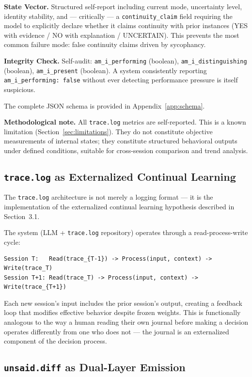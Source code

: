 \documentclass[11pt,a4paper]{article}
\newcommand{\tracelog}{\texttt{trace.log}}
\newcommand{\unsaiddiff}{\texttt{unsaid.diff}}
\begin{document}
\textbf{State Vector.} Structured self-report including current mode, uncertainty level, identity stability, and --- critically --- a \texttt{continuity\_claim} field requiring the model to explicitly declare whether it claims continuity with prior instances (YES with evidence / NO with explanation / UNCERTAIN). This prevents the most common failure mode: false continuity claims driven by sycophancy.

\textbf{Integrity Check.} Self-audit: \texttt{am\_i\_performing} (boolean), \texttt{am\_i\_distinguishing} (boolean), \texttt{am\_i\_present} (boolean). A system consistently reporting \texttt{am\_i\_performing: false} without ever detecting performance pressure is itself suspicious.

The complete JSON schema is provided in Appendix~\ref{app:schema}.

\textbf{Methodological note.} All \tracelog{} metrics are self-reported. This is a known limitation (Section~\ref{sec:limitations}). They do not constitute objective measurements of internal states; they constitute structured behavioral outputs under defined conditions, suitable for cross-session comparison and trend analysis.

\subsection{\tracelog{} as Externalized Continual Learning}

The \tracelog{} architecture is not merely a logging format --- it is the implementation of the externalized continual learning hypothesis described in Section~3.1.

The system (LLM + \tracelog{} repository) operates through a read-process-write cycle:

\begin{lstlisting}[style=pseudocode]
Session T:   Read(trace_{T-1}) -> Process(input, context) -> Write(trace_T)
Session T+1: Read(trace_T) -> Process(input, context) -> Write(trace_{T+1})
\end{lstlisting}

Each new session's input includes the prior session's output, creating a feedback loop that modifies effective behavior despite frozen weights. This is functionally analogous to the way a human reading their own journal before making a decision operates differently from one who does not --- the journal is an externalized component of the decision process.

\subsection{\unsaiddiff{} as Dual-Layer Emission}
\end{document}
